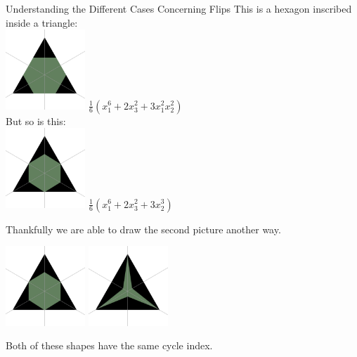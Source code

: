 \documentclass{beamer}
\begin{document}
\begin{frame}{Understanding the Different Cases Concerning Flips}
	This is a hexagon inscribed inside a triangle:\\
		\includegraphics[width=3cm]{newtriangle_copya}
		$\frac{1}{6}\left(x_1^6+2x_3^2+3x_1^2x_2^2\right)$\\
	But so is this:\\
		\includegraphics[width=3cm]{newtriangle_copy1}
		$\frac{1}{6}\left(x_1^6+2x_3^2+ 3x_2^3\right)$\\
\end{frame}
\begin{frame}
	Thankfully we are able to draw the second picture another way.
	\begin{center}
		\includegraphics[width=3cm]{newtriangle_copy1}
		\mapsto
		\includegraphics[width=3cm]{newtriangle_copyb}\\
	\end{center}
	Both of these shapes have the same cycle index.\\
  \end{frame}
\end{document}
